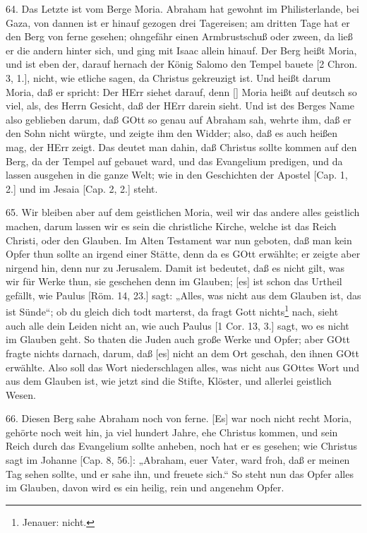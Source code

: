 64. Das Letzte ist vom Berge Moria. Abraham hat gewohnt im Philisterlande, bei Gaza, von dannen ist er hinauf gezogen drei Tagereisen; am dritten Tage hat er den Berg von ferne gesehen; ohngefähr einen Armbrustschuß oder zween, da ließ er die andern hinter sich, und ging mit Isaac allein hinauf. Der Berg heißt Moria, und ist eben der, darauf hernach der König Salomo den Tempel bauete [2 Chron. 3, 1.], nicht, wie etliche sagen, da Christus gekreuzigt ist. Und heißt darum Moria, daß er spricht: Der HErr siehet darauf, denn [] Moria heißt auf deutsch so viel, als, des
Herrn Gesicht, daß der HErr darein sieht. Und ist des Berges Name also geblieben darum, daß GOtt so genau auf Abraham sah, wehrte ihm, daß er den Sohn nicht würgte, und zeigte ihm den Widder; also, daß es auch heißen mag, der HErr zeigt. Das deutet man dahin, daß Christus sollte kommen auf den Berg, da der Tempel auf gebauet ward, und das Evangelium predigen, und da lassen ausgehen in die ganze Welt; wie in den Geschichten der Apostel [Cap. 1, 2.] und im Jesaia [Cap. 2, 2.] steht.

65. Wir bleiben aber auf dem geistlichen Moria, weil wir das andere alles geistlich machen, darum lassen wir es sein die christliche Kirche, welche ist das Reich Christi, oder den Glauben. Im Alten Testament war nun geboten, daß man kein Opfer thun sollte an irgend einer Stätte, denn da es GOtt erwählte; er zeigte aber nirgend hin, denn nur zu Jerusalem. Damit ist bedeutet, daß es nicht gilt, was wir für Werke thun, sie geschehen denn im Glauben; [es] ist schon das Urtheil gefällt, wie Paulus [Röm. 14, 23.] sagt: „Alles, was nicht aus dem Glauben ist, das ist Sünde“; ob du gleich dich todt marterst, da fragt Gott nichts\footnote{Jenauer: nicht.} nach, sieht auch alle dein Leiden nicht an, wie auch Paulus [1 Cor. 13, 3.] sagt, wo es nicht im Glauben geht. So thaten die Juden auch große Werke und Opfer; aber GOtt fragte nichts darnach, darum, daß [es] nicht an dem Ort geschah, den ihnen GOtt erwählte. Also soll das Wort niederschlagen alles, was nicht aus GOttes Wort und aus dem Glauben ist, wie jetzt sind die Stifte, Klöster, und allerlei geistlich Wesen.

66. Diesen Berg sahe Abraham noch von ferne. [Es] war noch nicht recht Moria, gehörte noch weit hin, ja viel hundert Jahre, ehe Christus kommen, und sein Reich durch das Evangelium sollte anheben, noch hat er es gesehen; wie Christus sagt im Johanne [Cap. 8, 56.]: „Abraham, euer Vater, ward froh, daß er meinen Tag sehen sollte, und er sahe ihn, und freuete sich.“ So steht nun das Opfer alles im Glauben, davon wird es ein heilig, rein und angenehm Opfer.

